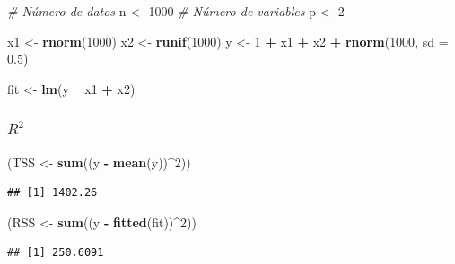 \documentclass[
  12pt,
]{book}
\newenvironment{Shaded}{\begin{snugshade}}{\end{snugshade}}
\newcommand{\CommentTok}[1]{\textcolor[rgb]{0.56,0.35,0.01}{\textit{#1}}}
\newcommand{\DataTypeTok}[1]{\textcolor[rgb]{0.13,0.29,0.53}{#1}}
\newcommand{\DecValTok}[1]{\textcolor[rgb]{0.00,0.00,0.81}{#1}}
\newcommand{\FloatTok}[1]{\textcolor[rgb]{0.00,0.00,0.81}{#1}}
\newcommand{\KeywordTok}[1]{\textcolor[rgb]{0.13,0.29,0.53}{\textbf{#1}}}
\newcommand{\NormalTok}[1]{#1}
\newcommand{\OperatorTok}[1]{\textcolor[rgb]{0.81,0.36,0.00}{\textbf{#1}}}
\newcommand{\StringTok}[1]{\textcolor[rgb]{0.31,0.60,0.02}{#1}}
\theoremstyle{definition}
\theoremstyle{definition}
\theoremstyle{definition}
\theoremstyle{remark}
\begin{document}
\begin{Shaded}
\begin{Highlighting}[]
\CommentTok{# Número de datos}
\NormalTok{n <-}\StringTok{ }\DecValTok{1000}
\CommentTok{# Número de variables}
\NormalTok{p <-}\StringTok{ }\DecValTok{2}

\NormalTok{x1 <-}\StringTok{ }\KeywordTok{rnorm}\NormalTok{(}\DecValTok{1000}\NormalTok{)}
\NormalTok{x2 <-}\StringTok{ }\KeywordTok{runif}\NormalTok{(}\DecValTok{1000}\NormalTok{)}
\NormalTok{y <-}\StringTok{ }\DecValTok{1} \OperatorTok{+}\StringTok{ }\NormalTok{x1 }\OperatorTok{+}\StringTok{ }\NormalTok{x2 }\OperatorTok{+}\StringTok{ }\KeywordTok{rnorm}\NormalTok{(}\DecValTok{1000}\NormalTok{, }\DataTypeTok{sd =} \FloatTok{0.5}\NormalTok{)}

\NormalTok{fit <-}\StringTok{ }\KeywordTok{lm}\NormalTok{(y }\OperatorTok{~}\StringTok{ }\NormalTok{x1 }\OperatorTok{+}\StringTok{ }\NormalTok{x2)}
\end{Highlighting}
\end{Shaded}

\hypertarget{r2}{%
\subsubsection{\texorpdfstring{\(R^2\)}{R\^{}2}}\label{r2}}

\begin{Shaded}
\begin{Highlighting}[]
\NormalTok{(TSS <-}\StringTok{ }\KeywordTok{sum}\NormalTok{((y }\OperatorTok{-}\StringTok{ }\KeywordTok{mean}\NormalTok{(y))}\OperatorTok{^}\DecValTok{2}\NormalTok{))}
\end{Highlighting}
\end{Shaded}

\begin{verbatim}
## [1] 1402.26
\end{verbatim}

\begin{Shaded}
\begin{Highlighting}[]
\NormalTok{(RSS <-}\StringTok{ }\KeywordTok{sum}\NormalTok{((y }\OperatorTok{-}\StringTok{ }\KeywordTok{fitted}\NormalTok{(fit))}\OperatorTok{^}\DecValTok{2}\NormalTok{))}
\end{Highlighting}
\end{Shaded}

\begin{verbatim}
## [1] 250.6091
\end{verbatim}
\end{document}

